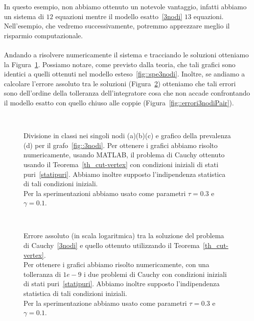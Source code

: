 In questo esempio, non abbiamo ottenuto un notevole vantaggio, infatti abbiamo un sistema di $12$ equazioni mentre il  modello esatto~\eqref{3nodi} $13$ equazioni. Nell'esempio, che vedremo successivamente, potremmo apprezzare meglio il risparmio computazionale.\\ \\
Andando a risolvere numericamente il sistema e tracciando le soluzioni otteniamo la  Figura~\ref{fig::3nodicut}. Possiamo notare, come previsto dalla teoria, che  tali grafici sono identici a quelli ottenuti nel modello esteso~\ref{fig::spe3nodi}. Inoltre, se andiamo a calcolare l'errore assoluto tra le soluzioni (Figura~\ref{fig::errori3nodi}) otteniamo che tali errori sono dell'ordine della tolleranza dell'integratore cosa che non accade confrontando il modello esatto con quello chiuso alle coppie (Figura~\ref{fig::errori3nodiPair}).
\begin{figure}[!htb]
\centering
\subfloat[][Nodo 1.]{}
\subfloat[][Nodo 2.]{}
\\
\subfloat[][Nodo 3.]{}
\subfloat[][Prevalenza.]{}
\caption[Sperimentazione in MATLAB relativo al grafo~\ref{fig::3nodi}]{Divisione in classi nei singoli nodi (a)(b)(c) e grafico della prevalenza (d) per il grafo~\ref{fig::3nodi}.  Per ottenere i grafici abbiamo risolto numericamente,  usando MATLAB,  il problema di Cauchy ottenuto usando il Teorema~\ref{th_cut-vertex} con condizioni iniziali  di stati puri~\eqref{statipuri}.  Abbiamo inoltre supposto l'indipendenza statistica di tali condizioni iniziali.\\
Per la sperimentazioni abbiamo usato come parametri $\tau= 0.3$ e $\gamma =0.1 $.}\label{fig::3nodicut}

\end{figure}
\begin{figure}[!htb]
\centering
\subfloat[][Nodo 1.]
{

}
\subfloat[][Nodo 2.]
{

}
\\
\subfloat[][Nodo 3.]
{

}

\caption[Errori assoluti relativi al grafo~\ref{fig::3nodi} tra modello esatto e cut-vertex] {Errore assoluto (in scala logaritmica) tra la soluzione del problema di Cauchy~\eqref{3nodi} e quello ottenuto utilizzando il Teorema~\ref{th_cut-vertex}.\\
Per ottenere i grafici abbiamo risolto numericamente, con una tolleranza di $1e-9$ i due problemi di Cauchy con condizioni iniziali di stati puri~\eqref{statipuri}. Abbiamo inoltre supposto l'indipendenza statistica di tali condizioni iniziali.\\
Per la sperimentazione abbiamo usato come parametri $\tau = 0.3$ e $\gamma = 0.1$. }
\label{fig::errori3nodi}
\end{figure}

